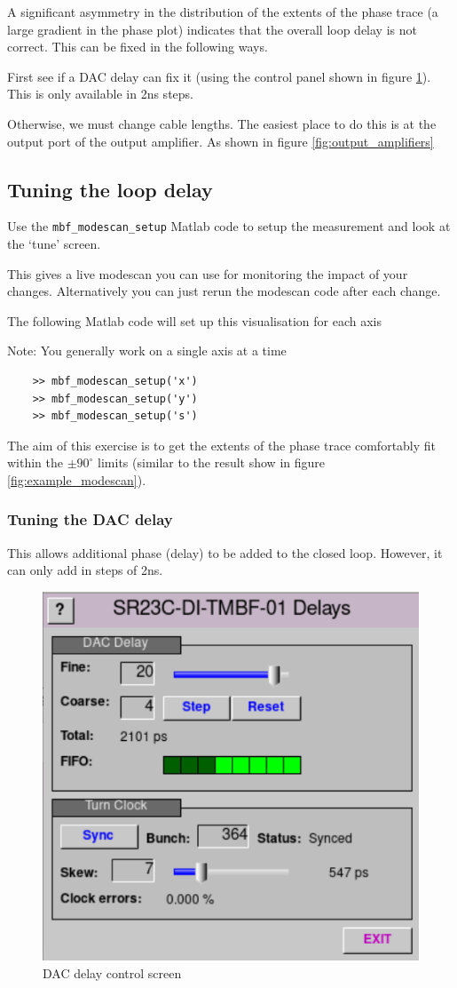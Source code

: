 \documentclass{report}
\begin{document}
A significant asymmetry in the distribution of the extents of the phase trace (a large gradient in the phase plot) indicates that the overall loop delay is not correct. This can be fixed in the following ways. 

First see if a DAC delay can fix it (using the control panel shown in figure \ref{fig:DAC_delay_screen}). This is only available in 2ns steps.

Otherwise, we must change cable lengths. The easiest place to do this is at the output port of the output amplifier. As shown in figure \ref{fig:output_amplifiers}
\clearpage
\subsection{Tuning the loop delay} 

Use the \verb+mbf_modescan_setup+ Matlab code to setup the measurement and look at the ‘tune’ screen. 

This gives a live modescan you can use for monitoring the impact of your changes. Alternatively you can just rerun the modescan code after each change.

The following Matlab code will set up this visualisation for each axis 

Note: You generally work on a single axis at a time 

\begin{verbatim}
    >> mbf_modescan_setup('x') 
    >> mbf_modescan_setup('y') 
    >> mbf_modescan_setup('s') 
\end{verbatim}
 
The aim of this exercise is to get the extents of the phase trace comfortably fit within the $\pm90^\circ$ limits (similar to the result show in figure \ref{fig:example_modescan}). 

\subsubsection{Tuning the DAC delay} 
This allows additional phase (delay) to be added to the closed loop. However, it can only add in steps of 2ns.
\begin{figure}[ht]
    \centering
    \includegraphics[width=0.5\linewidth]{DAC_delay.png}
    \caption{DAC delay control screen}
    \label{fig:DAC_delay_screen}
\end{figure}
\end{document}
